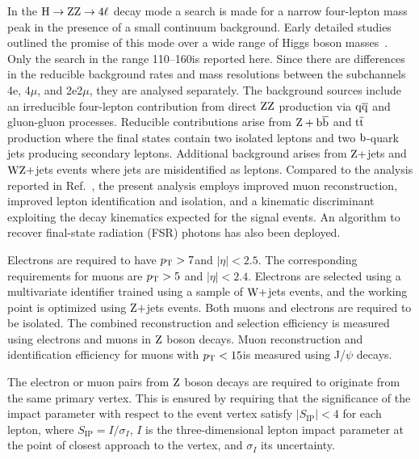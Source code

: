 \documentclass[11pt,twoside,a4paper,cmspaper,final]{cms-tdr}
\begin{document}
In the $\mathrm{H}\to\mathrm{Z}\mathrm{Z}\to 4\ell$ decay mode a search is made for a narrow four-lepton mass peak
in the presence of a small continuum background.
Early detailed studies outlined the promise of this mode over a
wide range of Higgs boson masses~\cite{DellaNegra1990a}.
Only the search in the range 110--160\GeV is
reported here.
Since there are differences in the reducible background rates and mass resolutions between the subchannels
4e, 4$\mu$, and 2e2$\mu$, they are analysed separately.
The background sources include
an irreducible four-lepton contribution from direct $\mathrm{Z}\mathrm{Z}$
production via $\mathrm{q}\overline{\mathrm{q}}$ and gluon-gluon processes.
Reducible contributions arise from
$\mathrm{Z}+\mathrm{b}\overline{\mathrm{b}}$ and $\mathrm{t}\overline{\mathrm{t}}$ production where the final states contain
two isolated leptons and two $\mathrm{b}$-quark jets producing secondary
leptons.
Additional background arises from $\mathrm{Z}+$jets and $\mathrm{W}\mathrm{Z}+$jets events where jets are misidentified as
leptons.
Compared to the analysis reported in Ref.~\cite{Chatrchyan:2012dg},
the present analysis employs improved muon reconstruction, improved
lepton identification and isolation, and a kinematic discriminant
exploiting the decay kinematics expected for the signal events.
An algorithm to recover final-state radiation (FSR) photons has also been deployed.

Electrons are required to have $p_{\mathrm{T}} > 7$\GeV and $|\eta| < 2.5$.
The corresponding requirements for muons are $p_{\mathrm{T}} > 5$\GeV
and $|\eta| < 2.4$.
Electrons are selected using a multivariate identifier trained using a sample of $\mathrm{W}+$jets events, and the
working point is optimized using $\mathrm{Z}+$jets events.
Both muons and electrons are required to be isolated.
The combined reconstruction and selection efficiency
is measured using electrons and muons in $\mathrm{Z}$ boson decays.
Muon reconstruction and identification efficiency for muons with
$p_{\mathrm{T}} < 15$\GeV  is measured using  J/$\psi$ decays.

The electron or muon pairs from $\mathrm{Z}$ boson decays are required to originate
from the same primary vertex.
This is ensured by requiring that the significance of the impact
parameter with respect to the event vertex satisfy $| S_\mathrm{IP} | < 4$
for each lepton, where $S_\mathrm{IP} = I/\sigma_{I}$,
$ I$ is the three-dimensional lepton impact parameter
at the point of closest approach to the vertex, and
$\sigma_{I}$ its uncertainty.
\end{document}

